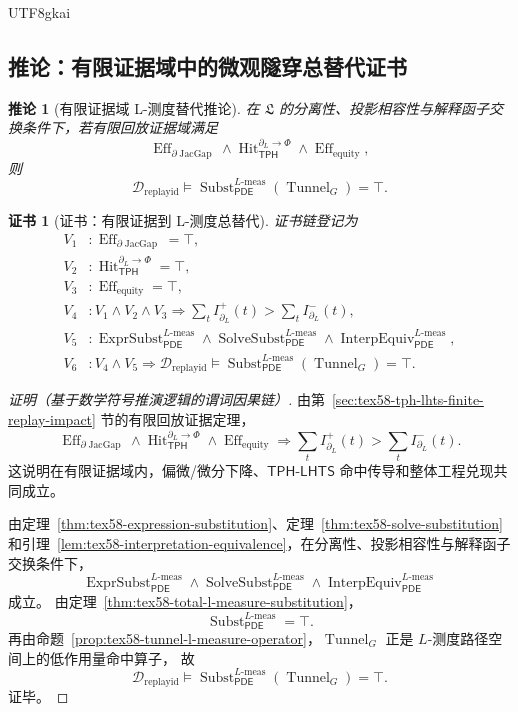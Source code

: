 \documentclass[12pt]{article}
\newtheorem{corollary}{推论}[section]
\newtheorem{Certificate}{证书}[section]
\newcommand{\TPH}{\ensuremath{\mathsf{TPH}}}
\newcommand{\TPHLHTS}{\ensuremath{\mathsf{TPH\mbox{-}LHTS}}}
\newcommand{\PDE}{\ensuremath{\mathsf{PDE}}}
\DeclareMathOperator{\Eff}{Eff}
\DeclareMathOperator{\Hit}{Hit}
\DeclareMathOperator{\JacGap}{JacGap}
\DeclareMathOperator{\Tunnel}{Tunnel}
\DeclareMathOperator{\Subst}{Subst}
\DeclareMathOperator{\ExprSubst}{ExprSubst}
\DeclareMathOperator{\SolveSubst}{SolveSubst}
\DeclareMathOperator{\InterpEquiv}{InterpEquiv}
\newcommand{\Lmeas}{L\text{-}\mathrm{meas}}
\begin{document}
\begin{CJK*}{UTF8}{gkai}
\subsection{推论：有限证据域中的微观隧穿总替代证书}
\label{subsec:tex58-finite-domain-l-measure-corollary}

\begin{corollary}[有限证据域 L-测度替代推论]
\label{cor:tex58-finite-domain-l-measure-substitution}
在 \(\mathfrak L\) 的分离性、投影相容性与解释函子交换条件下，若有限回放证据域满足
\[
  \Eff_{\partial\JacGap}
  \wedge
  \Hit_{\TPH}^{\partial_L\to\Phi}
  \wedge
  \Eff_{\mathrm{equity}},
\]
则
\[
  \mathcal D_{\mathrm{replayid}}
  \models
  \Subst_{\PDE}^{\Lmeas}(\Tunnel_G)=\top.
\]
\end{corollary}

\begin{Certificate}[证书：有限证据到 L-测度总替代]
\label{cert:tex58-finite-domain-l-measure-substitution}
证书链登记为
\[
\begin{aligned}
  V_1 &: \Eff_{\partial\JacGap}=\top,\\
  V_2 &: \Hit_{\TPH}^{\partial_L\to\Phi}=\top,\\
  V_3 &: \Eff_{\mathrm{equity}}=\top,\\
  V_4 &: V_1\wedge V_2\wedge V_3
  \Rightarrow
  \sum_t I^+_{\partial_L}(t)>\sum_t I^-_{\partial_L}(t),\\
  V_5 &: \ExprSubst_{\PDE}^{\Lmeas}\wedge
  \SolveSubst_{\PDE}^{\Lmeas}\wedge
  \InterpEquiv_{\PDE}^{\Lmeas},\\
  V_6 &: V_4\wedge V_5
  \Rightarrow
  \mathcal D_{\mathrm{replayid}}
  \models
  \Subst_{\PDE}^{\Lmeas}(\Tunnel_G)=\top.
\end{aligned}
\]
\end{Certificate}

\begin{proof}[证明（基于数学符号推演逻辑的谓词因果链）]
由第~\ref{sec:tex58-tph-lhts-finite-replay-impact} 节的有限回放证据定理，
\[
  \Eff_{\partial\JacGap}
  \wedge
  \Hit_{\TPH}^{\partial_L\to\Phi}
  \wedge
  \Eff_{\mathrm{equity}}
  \Rightarrow
  \sum_t I^+_{\partial_L}(t)>\sum_t I^-_{\partial_L}(t).
\]
这说明在有限证据域内，偏微/微分下降、\TPHLHTS{} 命中传导和整体工程兑现共同成立。

由定理~\ref{thm:tex58-expression-substitution}、定理~\ref{thm:tex58-solve-substitution}
和引理~\ref{lem:tex58-interpretation-equivalence}，在分离性、投影相容性与解释函子交换条件下，
\[
  \ExprSubst_{\PDE}^{\Lmeas}
  \wedge
  \SolveSubst_{\PDE}^{\Lmeas}
  \wedge
  \InterpEquiv_{\PDE}^{\Lmeas}
\]
成立。
由定理~\ref{thm:tex58-total-l-measure-substitution}，
\[
  \Subst_{\PDE}^{\Lmeas}=\top.
\]
再由命题~\ref{prop:tex58-tunnel-l-measure-operator}，\(\Tunnel_G\) 正是 \(L\)-测度路径空间上的低作用量命中算子，
故
\[
  \mathcal D_{\mathrm{replayid}}
  \models
  \Subst_{\PDE}^{\Lmeas}(\Tunnel_G)=\top.
\]
证毕。
\end{proof}


\end{CJK*}
\end{document}
